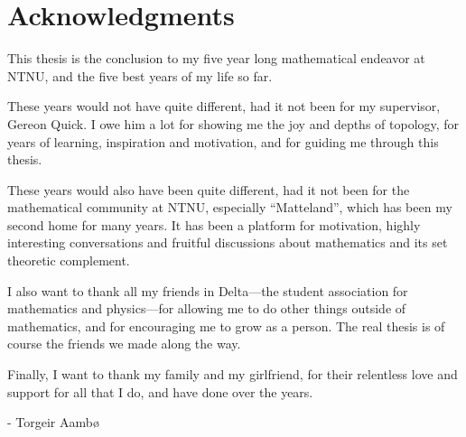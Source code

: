 

\section{Acknowledgments}

This thesis is the conclusion to my five year long mathematical endeavor at NTNU, and the five best years of my life so far. 

These years would not have quite different, had it not been for my supervisor, Gereon Quick. I owe him a lot for showing me the joy and depths of topology, for years of learning, inspiration and motivation, and for guiding me through this thesis. 

These years would also have been quite different, had it not been for the mathematical community at NTNU, especially ``Matteland'', which has been my second home for many years. It has been a platform for motivation, highly interesting conversations and fruitful discussions about mathematics and its set theoretic complement. 

I also want to thank all my friends in Delta---the student association for mathematics and physics---for allowing me to do other things outside of mathematics, and for encouraging me to grow as a person. The real thesis is of course the friends we made along the way. 

Finally, I want to thank my family and my girlfriend, for their relentless love and support for all that I do, and have done over the years. 

\hspace{\fill} - Torgeir Aambø
